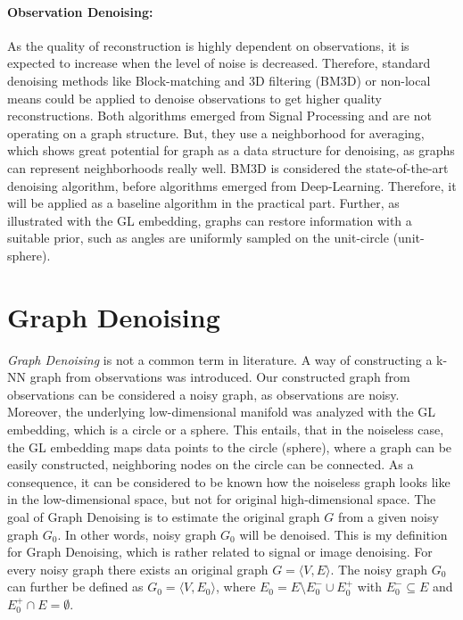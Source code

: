   \paragraph{Observation Denoising:}
  As the quality of reconstruction is highly dependent on observations, it
  is expected to increase when the level of noise is decreased.
  Therefore, standard denoising methods like Block-matching and 3D filtering (BM3D) \cite{bm3d} or 
  non-local means \cite{noneLocalMean} could be applied to denoise observations to get higher quality reconstructions.
  Both algorithms emerged from Signal Processing and are not operating on a graph structure. 
  But, they use a neighborhood for averaging, which shows great potential for graph 
  as a data structure for denoising, as graphs can represent neighborhoods really well.
  BM3D is considered the state-of-the-art denoising algorithm, before algorithms emerged from Deep-Learning.
  Therefore, it will be applied as a baseline algorithm in the practical part.
  Further, as illustrated with the GL embedding, graphs can restore information with a suitable prior,
  such as angles are uniformly sampled on the unit-circle (unit-sphere). 

  
\section{Graph Denoising}
\textit{Graph Denoising} is not a common term in literature.
A way of constructing a k-NN graph from observations was introduced.
Our constructed graph from observations can be considered a noisy graph, as observations are noisy. 
Moreover, the underlying low-dimensional manifold was analyzed with the GL embedding, which is a circle or a sphere.
This entails, that in the noiseless case, the GL embedding maps data points to the circle (sphere), 
where a graph can be easily constructed, neighboring nodes on the circle can be connected.
As a consequence, it can be considered to be known how the noiseless graph looks like in
the low-dimensional space, but not for original high-dimensional space. 
The goal of Graph Denoising is to estimate the original graph $G$ from a given noisy graph $G_0$.
In other words, noisy graph $G_0$ will be denoised.
This is my definition for Graph Denoising, which is rather related to signal or image denoising.
For every noisy graph there exists an original graph $G = \langle V,E \rangle$.
The noisy graph $G_0$ can further be defined as $G_0 = \langle V, E_0 \rangle$,  
 where $E_0 = E \setminus  E^{-}_0 \cup  E^{+}_0$ with $E^{-}_0 \subseteq E$ and $E^{+}_0 \cap E = \emptyset$.

